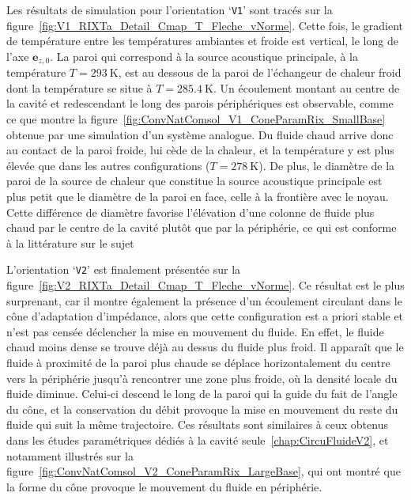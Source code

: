 Les résultats de simulation pour l'orientation `\texttt{V1}' sont tracés sur la figure~\ref{fig:V1_RIXTa_Detail_Cmap_T_Fleche_vNorme}. Cette fois, le gradient de température entre les températures ambiantes et froide est vertical, le long de l'axe $\mathbf e_{z,0}$. La paroi qui correspond à la source acoustique principale, à la température $T=\qty{293}{\kelvin}$, est au dessous de la paroi de l'échangeur de chaleur froid dont la température se situe à $T=\qty{285.4}{\kelvin}$. Un écoulement montant au centre de la cavité et redescendant le long des parois périphériques est observable, comme ce que montre la figure~\ref{fig:ConvNatComsol_V1_ConeParamRix_SmallBase} obtenue par une simulation d'un système analogue. Du fluide chaud arrive donc au contact de la paroi froide, lui cède de la chaleur, et la température y est plus élevée que dans les autres configurations ($T=\qty{278}{\kelvin}$). De plus, le diamètre de la paroi de la source de chaleur que constitue la source acoustique principale est plus petit que le diamètre de la paroi en face, celle à la frontière avec le noyau. Cette différence de diamètre favorise l'élévation d'une colonne de fluide plus chaud par le centre de la cavité plutôt que par la périphérie, ce qui est conforme à la littérature sur le sujet~\cite{basak_heat_2009}\smallskip

L'orientation `\texttt{V2}' est finalement présentée sur la figure~\ref{fig:V2_RIXTa_Detail_Cmap_T_Fleche_vNorme}. Ce résultat est le plus surprenant, car il montre également la présence d'un écoulement circulant dans le cône d'adaptation d'impédance, alors que cette configuration est a priori stable et n'est pas censée déclencher la mise en mouvement du fluide. En effet, le fluide chaud moins dense se trouve déjà au dessus du fluide plus froid. Il apparaît que le fluide à proximité de la paroi plus chaude se déplace horizontalement du centre vers la périphérie jusqu'à rencontrer une zone plus froide, où la densité locale du fluide diminue. Celui-ci descend le long de la paroi qui la guide du fait de l'angle du cône, et la conservation du débit provoque la mise en mouvement du reste du fluide qui suit la même trajectoire. Ces résultats sont similaires à ceux obtenus dans les études paramétriques dédiés à la cavité seule~\ref{chap:CircuFluideV2}, et notamment illustrés sur la figure~\ref{fig:ConvNatComsol_V2_ConeParamRix_LargeBase}, qui ont montré que la forme du cône provoque le mouvement du fluide en périphérie.\bigskip

